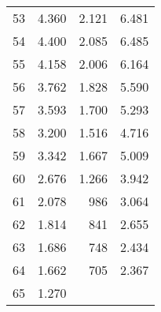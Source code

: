 \begin{tabular}{llll}
\multicolumn{1}{l}{\hspace{1em}53} &
  \multicolumn{1}{|r}{4.360} &
  \multicolumn{1}{r}{2.121} &
  \multicolumn{1}{r}{6.481} \\
\multicolumn{1}{l}{\hspace{1em}54} &
  \multicolumn{1}{|r}{4.400} &
  \multicolumn{1}{r}{2.085} &
  \multicolumn{1}{r}{6.485} \\
\multicolumn{1}{l}{\hspace{1em}55} &
  \multicolumn{1}{|r}{4.158} &
  \multicolumn{1}{r}{2.006} &
  \multicolumn{1}{r}{6.164} \\
\multicolumn{1}{l}{\hspace{1em}56} &
  \multicolumn{1}{|r}{3.762} &
  \multicolumn{1}{r}{1.828} &
  \multicolumn{1}{r}{5.590} \\
\multicolumn{1}{l}{\hspace{1em}57} &
  \multicolumn{1}{|r}{3.593} &
  \multicolumn{1}{r}{1.700} &
  \multicolumn{1}{r}{5.293} \\
\multicolumn{1}{l}{\hspace{1em}58} &
  \multicolumn{1}{|r}{3.200} &
  \multicolumn{1}{r}{1.516} &
  \multicolumn{1}{r}{4.716} \\
\multicolumn{1}{l}{\hspace{1em}59} &
  \multicolumn{1}{|r}{3.342} &
  \multicolumn{1}{r}{1.667} &
  \multicolumn{1}{r}{5.009} \\
\multicolumn{1}{l}{\hspace{1em}60} &
  \multicolumn{1}{|r}{2.676} &
  \multicolumn{1}{r}{1.266} &
  \multicolumn{1}{r}{3.942} \\
\multicolumn{1}{l}{\hspace{1em}61} &
  \multicolumn{1}{|r}{2.078} &
  \multicolumn{1}{r}{986} &
  \multicolumn{1}{r}{3.064} \\
\multicolumn{1}{l}{\hspace{1em}62} &
  \multicolumn{1}{|r}{1.814} &
  \multicolumn{1}{r}{841} &
  \multicolumn{1}{r}{2.655} \\
\multicolumn{1}{l}{\hspace{1em}63} &
  \multicolumn{1}{|r}{1.686} &
  \multicolumn{1}{r}{748} &
  \multicolumn{1}{r}{2.434} \\
\multicolumn{1}{l}{\hspace{1em}64} &
  \multicolumn{1}{|r}{1.662} &
  \multicolumn{1}{r}{705} &
  \multicolumn{1}{r}{2.367} \\
\multicolumn{1}{l}{\hspace{1em}65} &
  \multicolumn{1}{|r}{1.270} &

\end{tabular}

